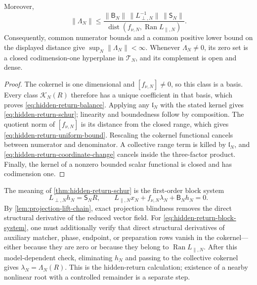 \begin{theorem}
Moreover,
\begin{equation}
 \|\Lambda_N\|
 \le
 \frac{\|\mathsf B_N\|\,\|L_{\perp,N}^{-1}\|\,
       \|\mathsf S_N\|}
      {\operatorname{dist}(f_{\nu,N},
          \operatorname{Ran}L_{\parallel,N})}.       \label{eq:hidden-return-uniform-bound}
\end{equation}
Consequently, common numerator bounds and a common positive lower bound on
the displayed distance give \(\sup_N\|\Lambda_N\|<\infty\).
Whenever \(\Lambda_N\ne0\), its zero set is a closed codimension-one
hyperplane in \(\mathcal T_N\), and its complement is open and dense.
\end{theorem}

\begin{proof}
The cokernel is one dimensional and \([f_{\nu,N}]\ne0\), so this class is a
basis.  Every class \(\mathcal K_N(R)\) therefore has a unique coefficient in
that basis, which proves \cref{eq:hidden-return-balance}.  Applying any
\(\mathfrak l_N\) with the stated kernel gives \cref{eq:hidden-return-schur};
linearity and boundedness follow by composition.  The quotient norm of
\([f_{\nu,N}]\) is its distance from the closed range, which gives
\cref{eq:hidden-return-uniform-bound}.  Rescaling the
cokernel functional cancels between numerator and denominator.  A collective
range term is killed by \(\mathfrak l_N\), and
\cref{eq:hidden-return-coordinate-change} cancels inside the three-factor
product.  Finally, the kernel of a
nonzero bounded scalar functional is closed and has codimension one.
\end{proof}

The meaning of \cref{thm:hidden-return-schur} is the first-order block system
\begin{equation}
 L_{\perp,N}h_N=\mathsf S_NR,\qquad
 L_{\parallel,N}x_N+f_{\nu,N}\lambda_N+\mathsf B_Nh_N=0.       \label{eq:hidden-return-block-system}
\end{equation}
By \cref{lem:projection-lift-chain}, exact projection blindness removes the
direct structural derivative of the reduced vector field.  For
\cref{eq:hidden-return-block-system}, one must additionally verify that
direct structural derivatives of auxiliary matcher, phase, endpoint, or
preparation rows vanish in the cokernel---either because they are zero or
because they belong to \(\operatorname{Ran}L_{\parallel,N}\).  After this
model-dependent check, eliminating \(h_N\) and passing to the collective
cokernel gives
\(\lambda_N=\Lambda_N(R)\).  This is the hidden-return calculation; existence
of a nearby nonlinear root with a controlled remainder is a separate step.

